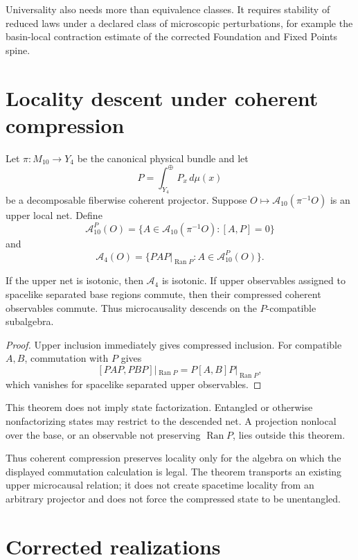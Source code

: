 \documentclass[11pt]{article}
\begin{document}
Universality also needs more than equivalence classes. It requires stability
of reduced laws under a declared class of microscopic perturbations, for
example the basin-local contraction estimate of the corrected Foundation and
Fixed Points spine.

\section{Locality descent under coherent compression}

Let $\pi:M_{10}\to Y_4$ be the canonical physical bundle and let
\[
 P=\int_{Y_4}^{\oplus}P_x\,d\mu(x)
\]
be a decomposable fiberwise coherent projector. Suppose
$O\mapsto\mathcal A_{10}(\pi^{-1}O)$ is an upper local net. Define
\[
 \mathcal A_{10}^P(O)
 =\{A\in\mathcal A_{10}(\pi^{-1}O):[A,P]=0\}
\]
and
\[
 \mathcal A_4(O)
 =\{PAP|_{\operatorname{Ran}P}:A\in\mathcal A_{10}^P(O)\}.
\]

\begin{theorem}\label{thm:locality}
If the upper net is isotonic, then $\mathcal A_4$ is isotonic. If upper
observables assigned to spacelike separated base regions commute, then their
compressed coherent observables commute. Thus microcausality descends on the
$P$-compatible subalgebra.
\end{theorem}

\begin{proof}
Upper inclusion immediately gives compressed inclusion. For compatible
$A,B$, commutation with $P$ gives
\[
 [PAP,PBP]|_{\operatorname{Ran}P}=P[A,B]P|_{\operatorname{Ran}P},
\]
which vanishes for spacelike separated upper observables.
\end{proof}

This theorem does not imply state factorization. Entangled or otherwise
nonfactorizing states may restrict to the descended net. A projection nonlocal
over the base, or an observable not preserving $\operatorname{Ran}P$, lies
outside this theorem.

Thus coherent compression preserves locality only for the algebra on which the
displayed commutation calculation is legal.  The theorem transports an
existing upper microcausal relation; it does not create spacetime locality from
an arbitrary projector and does not force the compressed state to be
unentangled.

\section{Corrected realizations}
\end{document}
